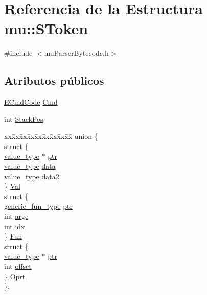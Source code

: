 \hypertarget{structmu_1_1_s_token}{}\section{Referencia de la Estructura mu\+:\+:S\+Token}
\label{structmu_1_1_s_token}


{\ttfamily \#include $<$mu\+Parser\+Bytecode.\+h$>$}

\subsection*{Atributos públicos}
\begin{DoxyCompactItemize}
\item 
\hyperlink{namespacemu_ab77181e591bebd278bf9c7a2e30ad40e}{E\+Cmd\+Code} \hyperlink{structmu_1_1_s_token_ae65874515716fe53e71fcae813b8fc5f}{Cmd}
\item 
int \hyperlink{structmu_1_1_s_token_af371dc5e396be91862e1cd4b0a908512}{Stack\+Pos}
\item 
\begin{tabbing}
xx\=xx\=xx\=xx\=xx\=xx\=xx\=xx\=xx\=\kill
union \{\\
\>struct \{\\
\>\>\hyperlink{namespacemu_a17d4f113a4b88b8d971cca8ddbbe8a47}{value\_type} $\ast$ \hyperlink{structmu_1_1_s_token_a0e49777c76e20ba5856ed7d6a499691f}{ptr}\\
\>\>\hyperlink{namespacemu_a17d4f113a4b88b8d971cca8ddbbe8a47}{value\_type} \hyperlink{structmu_1_1_s_token_ac8a30600d0f3721e676d2fe706f4520b}{data}\\
\>\>\hyperlink{namespacemu_a17d4f113a4b88b8d971cca8ddbbe8a47}{value\_type} \hyperlink{structmu_1_1_s_token_aac6f7c4c29647a815a3ecdcf66f5ac06}{data2}\\
\>\} \hyperlink{structmu_1_1_s_token_a6596797ebf4cedf041fc99316db70f59}{Val}\\
\>struct \{\\
\>\>\hyperlink{namespacemu_ae289766395042975b51dda382cccc907}{generic\_fun\_type} \hyperlink{structmu_1_1_s_token_a50235e1e981005a894fdf288657f8949}{ptr}\\
\>\>int \hyperlink{structmu_1_1_s_token_a88e90c6610efb6d7b7a7a8c3461bbc00}{argc}\\
\>\>int \hyperlink{structmu_1_1_s_token_a4bc527db03b2689a19cba6b5d679b2e4}{idx}\\
\>\} \hyperlink{structmu_1_1_s_token_a055128947fc2cf50c812e19d989388c0}{Fun}\\
\>struct \{\\
\>\>\hyperlink{namespacemu_a17d4f113a4b88b8d971cca8ddbbe8a47}{value\_type} $\ast$ \hyperlink{structmu_1_1_s_token_a0e49777c76e20ba5856ed7d6a499691f}{ptr}\\
\>\>int \hyperlink{structmu_1_1_s_token_a404867cb6511e90c552a0be2ff011119}{offset}\\
\>\} \hyperlink{structmu_1_1_s_token_a0bb06334fb4b3f6d7f0b9bb2e9aec09c}{Oprt}\\
\}; \\

\end{tabbing}\end{DoxyCompactItemize}


